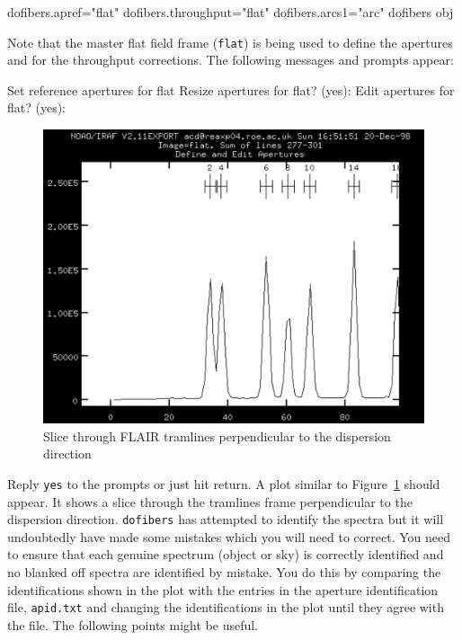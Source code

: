 \documentclass[chapters,twoside,11pt]{starlink}
\begin{document}
\begin{enumerate}
\begin{terminalv}
dofibers.apref="flat"
dofibers.throughput="flat"
dofibers.arcs1="arc" 
dofibers  obj
\end{terminalv}

   Note that the master flat field frame (\texttt{flat}) is being used to
   define the apertures and for the throughput corrections.  The following
   messages and prompts appear:

\begin{terminalv}
Set reference apertures for flat
Resize apertures for flat?  (yes):
Edit apertures for flat?  (yes):
\end{terminalv}

  \begin{figure}[htbp]
     \centering
     \includegraphics[totalheight=4in]{sc14_flair_tram}
     \caption{Slice through FLAIR tramlines perpendicular to the
      dispersion direction
     \label{FLAIR_TRAM} }
  \end{figure}

   Reply \texttt{yes} to the prompts or just hit return.  A plot similar
   to Figure~\ref{FLAIR_TRAM} should appear.  It shows a slice through
   the tramlines frame perpendicular to the dispersion direction.  \texttt{dofibers} has attempted to identify the spectra but it will
   undoubtedly have made some mistakes which you will need to correct.
   You need to ensure that each genuine spectrum (object or sky) is
   correctly identified and no blanked off spectra are identified by
   mistake.  You do this by comparing the identifications shown in the
   plot with the entries in the aperture identification file, \texttt{apid.txt} and changing the identifications in the plot until they
   agree with the file.  The following points might be useful.


\end{enumerate}
\end{document}
